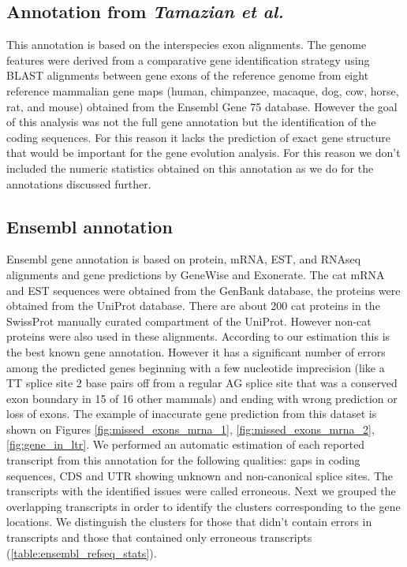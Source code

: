 \documentclass{article}
\begin{document}
\subsection{Annotation from \textit{Tamazian et al.}}
This annotation is based on the interspecies exon alignments.
The genome features were derived from a comparative gene identification strategy using BLAST alignments between gene exons of the reference genome from eight reference mammalian gene maps (human, chimpanzee, macaque, dog, cow, horse, rat, and mouse) obtained from the Ensembl Gene 75 database.
However the goal of this analysis was not the full gene annotation but the identification of the coding sequences. For this reason it lacks the prediction of exact gene structure that would be important for the gene evolution analysis. For this reason we don’t included the numeric statistics obtained on this annotation as we do for the annotations discussed further.

\subsection{Ensembl annotation}
Ensembl gene annotation is based on protein, mRNA, EST, and RNAseq alignments and gene predictions by GeneWise and Exonerate. The cat mRNA and EST sequences were obtained from the GenBank database, the proteins were obtained from the UniProt database. There are about 200 cat proteins in the SwissProt manually curated compartment of the UniProt. However non-cat proteins  were also used in these alignments.
According to our estimation this is the best known gene annotation. 
However it has a significant number of errors among the predicted genes beginning with a few nucleotide imprecision (like a TT splice site 2 base pairs off from a regular AG splice site that was a conserved exon boundary in 15 of 16 other mammals) and ending with wrong prediction or loss of exons.
The example of inaccurate gene prediction from this dataset is shown on Figures \ref{fig:missed_exons_mrna_1}, \ref{fig:missed_exons_mrna_2}, \ref{fig:gene_in_ltr}.
We performed an automatic estimation of each reported transcript from this annotation for the following qualities: gaps in coding sequences, CDS and UTR showing unknown and non-canonical splice sites. The transcripts with the identified issues were called erroneous. Next we grouped the overlapping transcripts in order to identify the clusters corresponding to the gene locations. We distinguish the clusters for those that didn’t contain errors in transcripts and those that contained only erroneous transcripts (\ref{table:ensembl_refseq_stats}). 
\end{document}
